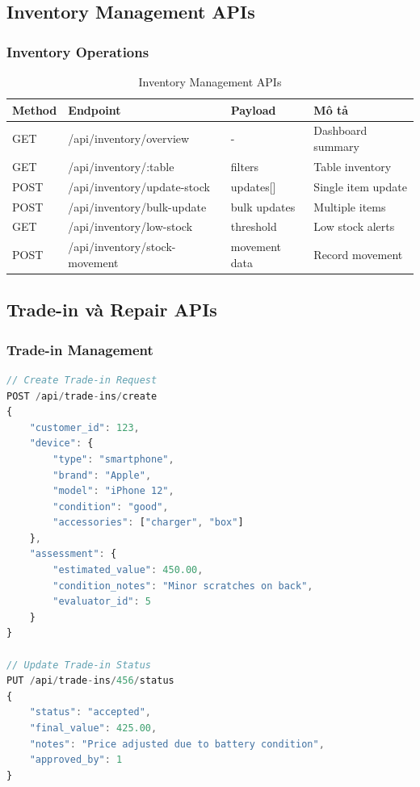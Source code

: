 \documentclass[12pt,a4paper]{article}
\begin{document}
\subsection{Inventory Management APIs}
\subsubsection{Inventory Operations}
\begin{table}[H]
\centering
\begin{tabular}{@{}llll@{}}
\toprule
\textbf{Method} & \textbf{Endpoint} & \textbf{Payload} & \textbf{Mô tả} \\
\midrule
GET & /api/inventory/overview & - & Dashboard summary \\
GET & /api/inventory/:table & filters & Table inventory \\
POST & /api/inventory/update-stock & updates[] & Single item update \\
POST & /api/inventory/bulk-update & bulk updates & Multiple items \\
GET & /api/inventory/low-stock & threshold & Low stock alerts \\
POST & /api/inventory/stock-movement & movement data & Record movement \\
\bottomrule
\end{tabular}
\caption{Inventory Management APIs}
\end{table}

\subsection{Trade-in và Repair APIs}
\subsubsection{Trade-in Management}
\begin{lstlisting}[language=javascript, caption=Trade-in API Examples]
// Create Trade-in Request
POST /api/trade-ins/create
{
    "customer_id": 123,
    "device": {
        "type": "smartphone",
        "brand": "Apple", 
        "model": "iPhone 12",
        "condition": "good",
        "accessories": ["charger", "box"]
    },
    "assessment": {
        "estimated_value": 450.00,
        "condition_notes": "Minor scratches on back",
        "evaluator_id": 5
    }
}

// Update Trade-in Status
PUT /api/trade-ins/456/status
{
    "status": "accepted",
    "final_value": 425.00,
    "notes": "Price adjusted due to battery condition",
    "approved_by": 1
}
\end{lstlisting}
\end{document}
